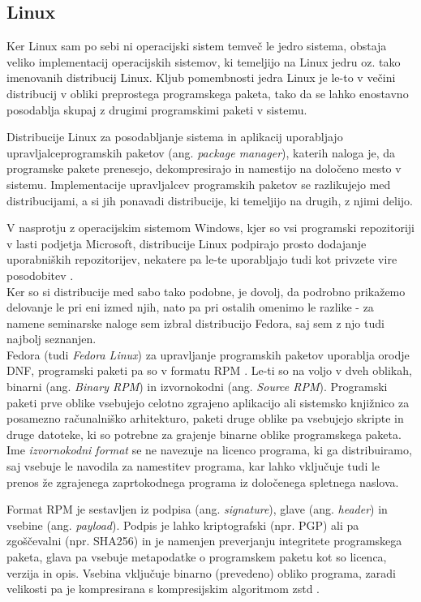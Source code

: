 \subsection{Linux}

Ker Linux sam po sebi ni operacijski sistem temveč le jedro sistema, obstaja veliko implementacij operacijskih sistemov,
ki temeljijo na Linux jedru oz. tako imenovanih distribucij Linux.
Kljub pomembnosti jedra Linux je le-to v večini distribucij v obliki preprostega programskega paketa,
tako da se lahko enostavno posodablja skupaj z drugimi programskimi paketi v sistemu.

Distribucije Linux za posodabljanje sistema in aplikacij uporabljajo upravljalce\linebreak programskih paketov
(ang. \emph{package manager}), katerih naloga je, da programske pakete prenesejo,
dekompresirajo in namestijo na določeno mesto v sistemu.
Implementacije upravljalcev programskih paketov se razlikujejo med distribucijami,
a si jih ponavadi distribucije, ki temeljijo na drugih, z njimi delijo.

V nasprotju z operacijskim sistemom Windows, kjer so vsi programski repozitoriji v lasti podjetja Microsoft,
distribucije Linux podpirajo prosto dodajanje uporabniških repozitorijev, nekatere pa le-te uporabljajo tudi
kot privzete vire posodobitev \cite{arch-mirrors}.\\

Ker so si distribucije med sabo tako podobne, je dovolj, da podrobno prikažemo delovanje le pri eni izmed njih, nato
pa pri ostalih omenimo le razlike - za namene seminarske naloge sem izbral distribucijo Fedora, saj sem z njo tudi
najbolj seznanjen.\\

Fedora (tudi \emph{Fedora Linux}) za upravljanje programskih paketov uporablja orodje DNF,
programski paketi pa so v formatu RPM \cite{rpm}.
Le-ti so na voljo v dveh oblikah, binarni (ang. \emph{Binary RPM}) in izvornokodni (ang. \emph{Source RPM}).
Programski paketi prve oblike vsebujejo celotno zgrajeno aplikacijo ali sistemsko knjižnico za posamezno
računalniško arhitekturo, paketi druge oblike pa vsebujejo skripte in druge datoteke, ki so potrebne za grajenje
binarne oblike programskega paketa.
Ime \emph{izvornokodni format} se ne navezuje na licenco programa, ki ga distribuiramo, saj vsebuje le navodila
za namestitev programa, kar lahko vključuje tudi le prenos že zgrajenega zaprtokodnega programa
iz določenega spletnega naslova.

Format RPM je sestavljen iz podpisa (ang. \emph{signature}), glave (ang. \emph{header}) in vsebine
(ang. \emph{payload}).
Podpis je lahko kriptografski (npr. PGP) ali pa zgoščevalni (npr. SHA256) in je namenjen preverjanju integritete
programskega paketa, glava pa vsebuje metapodatke o programskem paketu kot so licenca, verzija in opis.
Vsebina vključuje binarno (prevedeno) obliko programa, zaradi velikosti pa je kompresirana
s kompresijskim algoritmom zstd \cite{fedora-zstd}.

